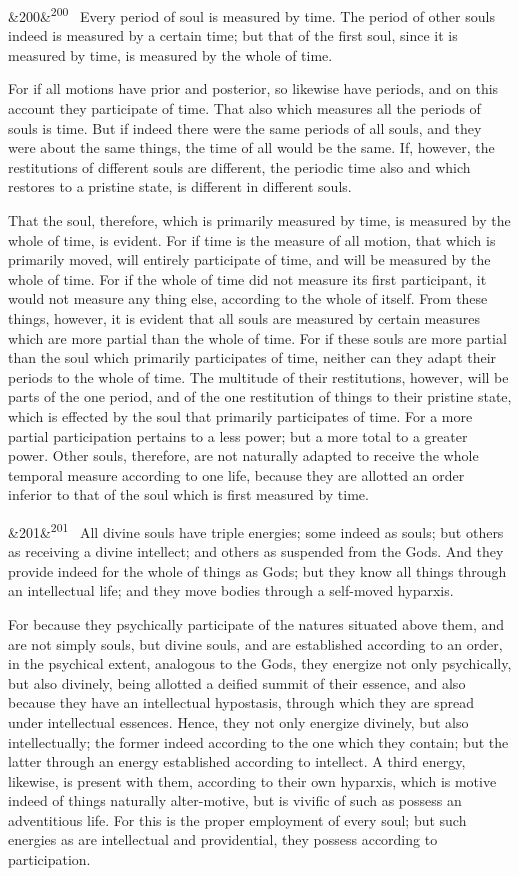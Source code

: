 \documentclass[12pt]{article}
\newcommand{\para}[1][]{\par\noindent\ifx&#1&\else\textsuperscript{\footnotesize #1}~\fi}
\begin{document}
\para[200] Every period of soul is measured by time. The period of other souls indeed is measured by a certain time; but that of the first soul, since it is measured by time, is measured by the whole of time.

For if all motions have prior and posterior, so likewise have periods, and on this account they participate of time. That also which measures all the periods of souls is time. But if indeed there were the same periods of all souls, and they were about the same things, the time of all would be the same. If, however, the restitutions of different souls are different, the periodic time also and which restores to a pristine state, is different in different souls.

That the soul, therefore, which is primarily measured by time, is measured by the whole of time, is evident. For if time is the measure of all motion, that which is primarily moved, will entirely participate of time, and will be measured by the whole of time. For if the whole of time did not measure its first participant, it would not measure any thing else, according to the whole of itself. From these things, however, it is evident that all souls are measured by certain measures which are more partial than the whole of time. For if these souls are more partial than the soul which primarily participates of time, neither can they adapt their periods to the whole of time. The multitude of their restitutions, however, will be parts of the one period, and of the one restitution of things to their pristine state, which is effected by the soul that primarily participates of time. For a more partial participation pertains to a less power; but a more total to a greater power. Other souls, therefore, are not naturally adapted to receive the whole temporal measure according to one life, because they are allotted an order inferior to that of the soul which is first measured by time.

\para[201] All divine souls have triple energies; some indeed as souls; but others as receiving a divine intellect; and others as suspended from the Gods. And they provide indeed for the whole of things as Gods; but they know all things through an intellectual life; and they move bodies through a self-moved hyparxis.

For because they psychically participate of the natures situated above them, and are not simply souls, but divine souls, and are established according to an order, in the psychical extent, analogous to the Gods, they energize not only psychically, but also divinely, being allotted a deified summit of their essence, and also because they have an intellectual hypostasis, through which they are spread under intellectual essences. Hence, they not only energize divinely, but also intellectually; the former indeed according to the one which they contain; but the latter through an energy established according to intellect. A third energy, likewise, is present with them, according to their own hyparxis, which is motive indeed of things naturally alter-motive, but is vivific of such as possess an adventitious life. For this is the proper employment of every soul; but such energies as are intellectual and providential, they possess according to participation.
\end{document}
